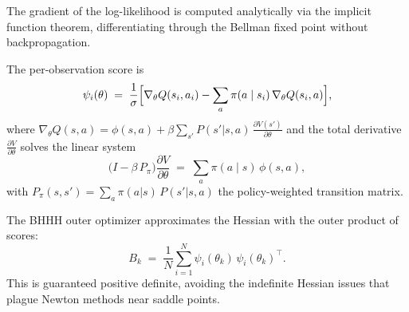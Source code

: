 \documentclass[11pt]{article}
\begin{document}
The gradient of the log-likelihood is computed analytically via the implicit function theorem, differentiating through the Bellman fixed point without backpropagation.

The per-observation score is
\begin{equation}
\label{eq:score}
\psi_i(\theta) \;=\; \frac{1}{\sigma}\Bigl[\nabla_\theta Q(s_i,a_i) - \sum_{a} \pi(a \mid s_i)\,\nabla_\theta Q(s_i,a)\Bigr],
\end{equation}
where $\nabla_\theta Q(s,a) = \phi(s,a) + \beta \sum_{s'} P(s'|s,a)\,\frac{\partial V(s')}{\partial \theta}$ and the total derivative $\frac{\partial V}{\partial \theta}$ solves the linear system
\begin{equation}
\label{eq:implicit}
\bigl(I - \beta\, P_\pi\bigr) \frac{\partial V}{\partial \theta} \;=\; \sum_{a} \pi(a \mid s)\, \phi(s,a),
\end{equation}
with $P_\pi(s,s') = \sum_a \pi(a|s)\,P(s'|s,a)$ the policy-weighted transition matrix.

The BHHH outer optimizer approximates the Hessian with the outer product of scores:
\begin{equation}
\label{eq:bhhh}
B_k \;=\; \frac{1}{N}\sum_{i=1}^{N} \psi_i(\theta_k)\,\psi_i(\theta_k)^\top.
\end{equation}
This is guaranteed positive definite, avoiding the indefinite Hessian issues that plague Newton methods near saddle points.
\end{document}
